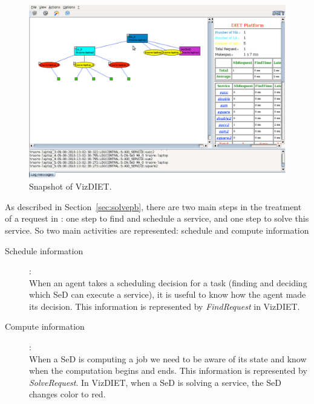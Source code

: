 \begin{figure}[htb]
  \begin{center}
    \includegraphics[scale=0.45]{fig/VizDIET}
    \caption{Snapshot of VizDIET.}
    \label{fig:snapshot}
  \end{center}
\end{figure}

As described in Section~\ref{sec:solvepb}, there are two main steps in the
treatment of a request in \diet: one step to find and schedule a service, and
one step to solve this service. So two main activities are represented:
schedule and compute information\\
\begin{description}
  \item [Schedule information]:\\ When an agent takes a scheduling decision for
    a task (\ie finding and deciding which SeD can execute a service), it is
    useful to know how the agent made its decision. This information is
    represented by \textit{FindRequest} in VizDIET.
  \item [Compute information]:\\ When a SeD is computing a job we need to be
    aware of its state and know when the computation begins and ends. This
    information is represented by \textit{SolveRequest}. In VizDIET, when a SeD
    is solving a service, the SeD changes color to red.\\
\end{description}

